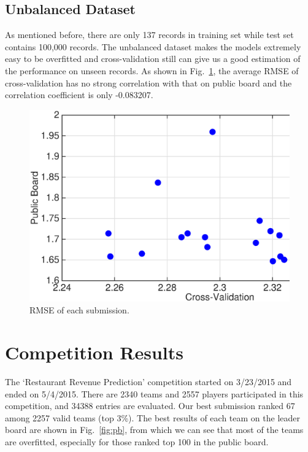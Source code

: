 \documentclass[10pt, oneside]{article}   	%
\newcommand\figref{Fig.~\ref}
\begin{document}
 
\subsection{Unbalanced Dataset}
As mentioned before, there are only 137 records in training set while test set contains 100,000 records.
The unbalanced dataset makes the models extremely easy to be overfitted and cross-validation still can give us a good estimation of the performance on unseen records.
As shown in \figref{fig:cv_lb_error}, the average RMSE of cross-validation has no strong correlation with that on public board and the correlation coefficient is only -0.083207.

\begin{figure}[h]
   \centering
   \includegraphics[width=5.8in]{figs/cv_pb_scores.eps} 
   \caption{RMSE of each submission.}
   \label{fig:cv_lb_error}
\end{figure}

\section{Competition Results}
The `Restaurant Revenue Prediction' competition started on 3/23/2015 and ended on 5/4/2015.
There are 2340 teams and 2557 players participated in this competition, and 34388 entries are evaluated.
Our best submission ranked 67 among 2257 valid teams (top 3\%).
The best results of each team on the leader board are shown in \figref{fig:pb},
from which we can see that most of the teams are overfitted, especially for those ranked top 100 in the public board.
\end{document}
